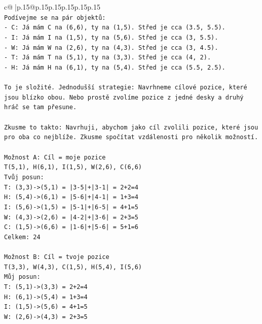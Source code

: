 \documentclass{article}
\begin{document}
{\begin{supertabular}{c@{$\;$}|p{.15\linewidth}@{}p{.15\linewidth}p{.15\linewidth}p{.15\linewidth}p{.15\linewidth}p{.15\linewidth}}
{{{\\ 
\texttt{Podívejme se na pár objektů:} \\
\texttt{{-} C: Já mám C na (6,6), ty na (1,5). Střed je cca (3.5, 5.5).} \\
\texttt{{-} I: Já mám I na (1,5), ty na (5,6). Střed je cca (3, 5.5).} \\
\texttt{{-} W: Já mám W na (2,6), ty na (4,3). Střed je cca (3, 4.5).} \\
\texttt{{-} T: Já mám T na (5,1), ty na (3,3). Střed je cca (4, 2).} \\
\texttt{{-} H: Já mám H na (6,1), ty na (5,4). Střed je cca (5.5, 2.5).} \\
\\ 
\texttt{To je složité. Jednodušší strategie: Navrhneme cílové pozice, které jsou blízko obou. Nebo prostě zvolíme pozice z jedné desky a druhý hráč se tam přesune.} \\
\\ 
\texttt{Zkusme to takto: Navrhuji, abychom jako cíl zvolili pozice, které jsou pro oba co nejblíže. Zkusme spočítat vzdálenosti pro několik možností.} \\
\\ 
\texttt{Možnost A: Cíl = moje pozice} \\
\texttt{T(5,1), H(6,1), I(1,5), W(2,6), C(6,6)} \\
\texttt{Tvůj posun:} \\
\texttt{T: (3,3){-}>(5,1) = |3{-}5|+|3{-}1| = 2+2=4} \\
\texttt{H: (5,4){-}>(6,1) = |5{-}6|+|4{-}1| = 1+3=4} \\
\texttt{I: (5,6){-}>(1,5) = |5{-}1|+|6{-}5| = 4+1=5} \\
\texttt{W: (4,3){-}>(2,6) = |4{-}2|+|3{-}6| = 2+3=5} \\
\texttt{C: (1,5){-}>(6,6) = |1{-}6|+|5{-}6| = 5+1=6} \\
\texttt{Celkem: 24} \\
\\ 
\texttt{Možnost B: Cíl = tvoje pozice} \\
\texttt{T(3,3), W(4,3), C(1,5), H(5,4), I(5,6)} \\
\texttt{Můj posun:} \\
\texttt{T: (5,1){-}>(3,3) = 2+2=4} \\
\texttt{H: (6,1){-}>(5,4) = 1+3=4} \\
\texttt{I: (1,5){-}>(5,6) = 4+1=5} \\
\texttt{W: (2,6){-}>(4,3) = 2+3=5} \\
}}}
\end{supertabular}}
\end{document}
